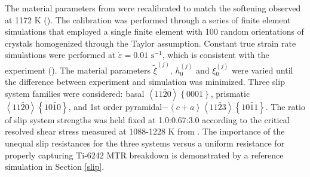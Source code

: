 \documentclass[review]{elsarticle}
\begin{document}
	The material parameters from \cite{r18} were recalibrated to match the softening observed at 1172 K (\cite{r26}).
	The calibration was performed through a series of finite element simulations that employed a single finite element with 100 random orientations of crystals homogenized through the Taylor assumption.
	Constant true strain rate simulations were performed at $\dot{\varepsilon}=0.01\text{ s}^{-1}$, which is consistent with the experiment (\cite{r26}).
	The material parameters $\tilde{\xi}^{(j)}$, $h{_0^{(j)}}$ and $\xi{_0^{(j)}}$ were varied until the difference between experiment and simulation was minimized.
	Three slip system families were considered: basal $\left< 11\bar{2}0 \right>\left\lbrace 0001 \right\rbrace$, prismatic $\left< 11\bar{2}0 \right>\left\lbrace 10\bar{1}0 \right\rbrace$, and 1st order pyramidal$-\left< c+a \right> \left< 11\bar{2}3 \right>\left\lbrace 10\bar{1}1 \right\rbrace$.
	The ratio of slip system strengths was held fixed at 1.0:0.67:3.0 according to the critical resolved shear stress measured at 1088-1228 K from \cite{r27}.
	The importance of the unequal slip resistances for the three systems versus a uniform resistance for properly capturing Ti-6242 MTR breakdown is demonstrated by a reference simulation in Section \ref{slip}.
	
\end{document}
